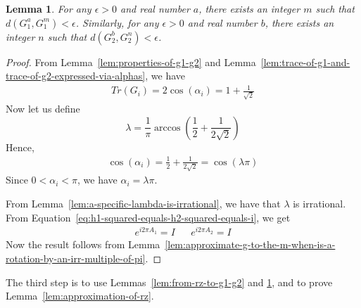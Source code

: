 \documentclass[11pt]{article}
\def\({\begin{eqnarray*}}
\def\){\end{eqnarray*}}
\newtheorem{lemma}[theorem]{Lemma}
\begin{document}
\newpage

\begin{lemma}
\label{lem:approximate-g1-a-g2-b}
For any $\epsilon > 0$ and real number $a$,
there exists an integer $m$ such that 
$d(G_1^a, G_1^m) < \epsilon$.
Similarly, for any $\epsilon > 0$ and real number $b$,
there exists an integer $n$ such that 
$d(G_2^b, G_2^n) < \epsilon$.
\end{lemma}

\begin{proof}%
From 
Lemma~\ref{lem:properties-of-g1-g2} and
Lemma~\ref{lem:trace-of-g1-and-trace-of-g2-expressed-via-alphas},
we have
\(
Tr(G_i) 
= 2 \cos(\alpha_i) 
= 1 + \frac{1}{\sqrt{2}} 
\)
Now let us define 
\[
\lambda
=
\frac{1}{\pi}
\arccos\!\left(
\frac{1}{2}
+
\frac{1}{2\sqrt{2}}
\right)
\]
Hence, 
\(
\cos(\alpha_i) = \frac{1}{2} + \frac{1}{2\sqrt{2}} = \cos(\lambda \pi)
\)
Since $0 < \alpha_i < \pi$, 
we have
$\alpha_i=\lambda\pi$.

From Lemma~\ref{lem:a-specific-lambda-is-irrational}, 
we have that $\lambda$ is irrational.
From Equation~\ref{eq:h1-squared-equals-h2-squared-equals-i}, 
we get
\(
e^{i 2 \pi A_1} = I 
&&
e^{i 2 \pi A_2} = I
\)
Now the result follows from 
Lemma~\ref{lem:approximate-g-to-the-m-when-is-a-rotation-by-an-irr-multiple-of-pi}.
\end{proof}

% 

The third step is to use
Lemmas~\ref{lem:from-rz-to-g1-g2} and \ref{lem:approximate-g1-a-g2-b}, and
to prove Lemma~\ref{lem:approximation-of-rz}.
\end{document}
